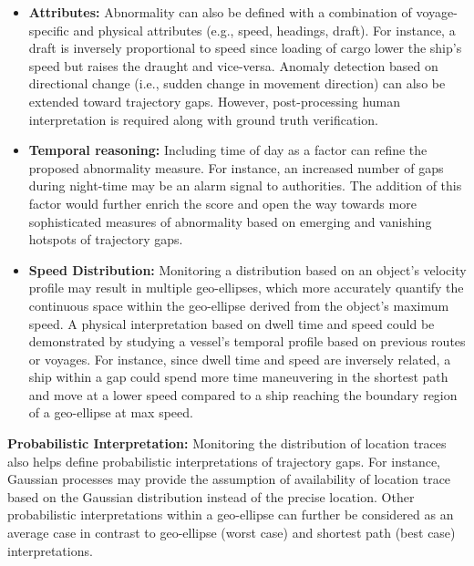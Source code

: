 \documentclass[acmsmall]{acmart}
\begin{document}
\begin{itemize}
\item \textbf{Attributes:} Abnormality can also be defined with a combination of voyage-specific and physical attributes (e.g., speed, headings, draft). For instance, a draft is inversely proportional to speed since loading of cargo lower the ship's speed but raises the draught and vice-versa. Anomaly detection based on directional change (i.e., sudden change in movement direction) can also be extended toward trajectory gaps. However, post-processing human interpretation is required along with ground truth verification. 

\item \textbf{Temporal reasoning:} Including time of day as a factor can refine the proposed abnormality measure. For instance, an increased number of gaps during night-time may be an alarm signal to authorities. The addition of this factor would further enrich the score and open the way towards more sophisticated measures of abnormality based on emerging and vanishing hotspots of trajectory gaps.

\item \textbf{Speed Distribution:} Monitoring a distribution based on an object's velocity profile may result in multiple geo-ellipses, which more accurately quantify the continuous space within the geo-ellipse derived from the object's maximum speed. A physical interpretation based on dwell time and speed could be demonstrated by studying a vessel's temporal profile based on previous routes or voyages. For instance, since dwell time and speed are inversely related, a ship within a gap could spend more time maneuvering in the shortest path and move at a lower speed compared to a ship reaching the boundary region of a geo-ellipse at max speed.\\
\end{itemize}

\textbf{Probabilistic Interpretation:} Monitoring the distribution of location traces also helps define probabilistic interpretations of trajectory gaps. For instance, Gaussian processes may provide the assumption of availability of location trace based on the Gaussian distribution instead of the precise location. Other probabilistic interpretations within a geo-ellipse can further be considered as an average case in contrast to geo-ellipse (worst case) and shortest path (best case) interpretations. \\
\end{document}
